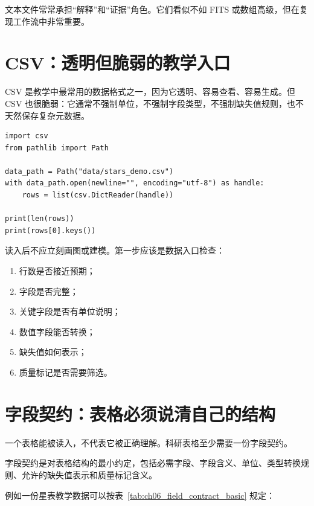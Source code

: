 文本文件常常承担“解释”和“证据”角色。它们看似不如 FITS 或数组高级，但在复现工作流中非常重要。

\section{CSV：透明但脆弱的教学入口}

CSV 是教学中最常用的数据格式之一，因为它透明、容易查看、容易生成。但 CSV 也很脆弱：它通常不强制单位，不强制字段类型，不强制缺失值规则，也不天然保存复杂元数据。

\begin{examplebox}
\begin{lstlisting}[style=pythonstyle]
import csv
from pathlib import Path

data_path = Path("data/stars_demo.csv")
with data_path.open(newline="", encoding="utf-8") as handle:
    rows = list(csv.DictReader(handle))

print(len(rows))
print(rows[0].keys())
\end{lstlisting}
\end{examplebox}

读入后不应立刻画图或建模。第一步应该是数据入口检查：

\begin{enumerate}
    \item 行数是否接近预期；
    \item 字段是否完整；
    \item 关键字段是否有单位说明；
    \item 数值字段能否转换；
    \item 缺失值如何表示；
    \item 质量标记是否需要筛选。
\end{enumerate}

\section{字段契约：表格必须说清自己的结构}

一个表格能被读入，不代表它被正确理解。科研表格至少需要一份字段契约。

\begin{defbox}[字段契约]
字段契约是对表格结构的最小约定，包括必需字段、字段含义、单位、类型转换规则、允许的缺失值表示和质量标记含义。
\end{defbox}

例如一份星表教学数据可以按表~\ref{tab:ch06_field_contract_basic} 规定：

